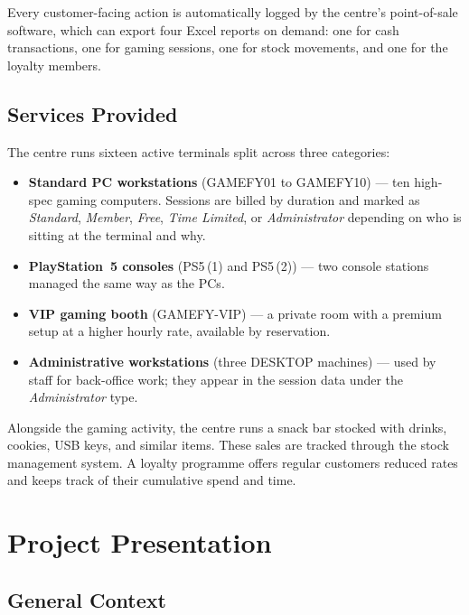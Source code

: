 \documentclass[12pt, a4paper]{report}
\begin{document}
Every customer-facing action is automatically logged by the centre's
point-of-sale software, which can export four Excel reports on demand: one for
cash transactions, one for gaming sessions, one for stock movements, and one for
the loyalty members.

\subsection{Services Provided}

The centre runs sixteen active terminals split across three categories:

\begin{itemize}
  \item \textbf{Standard PC workstations} (\textsc{GAMEFY01} to \textsc{GAMEFY10})
        — ten high-spec gaming computers. Sessions are billed by duration and
        marked as \textit{Standard}, \textit{Member}, \textit{Free},
        \textit{Time Limited}, or \textit{Administrator} depending on who is
        sitting at the terminal and why.

  \item \textbf{PlayStation~5 consoles} (\textsc{PS5\,(1)} and \textsc{PS5\,(2)})
        — two console stations managed the same way as the PCs.

  \item \textbf{VIP gaming booth} (\textsc{GAMEFY-VIP}) — a private room with a
        premium setup at a higher hourly rate, available by reservation.

  \item \textbf{Administrative workstations} (three \textsc{DESKTOP} machines) —
        used by staff for back-office work; they appear in the session data
        under the \textit{Administrator} type.
\end{itemize}

Alongside the gaming activity, the centre runs a snack bar stocked with drinks,
cookies, USB keys, and similar items. These sales are tracked through the stock
management system. A loyalty programme offers regular customers reduced rates and
keeps track of their cumulative spend and time.

\section{Project Presentation}

\subsection{General Context}
\end{document}
